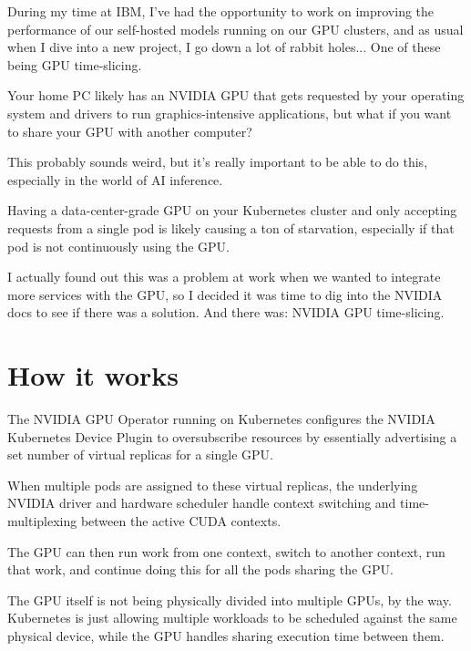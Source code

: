 

\newcommand{\DocTitle}{GPU sharing via Timeslicing in Kubernetes}
\newcommand{\DocDescription}{brother can you spare some GPU cycles?}
\newcommand{\DocTags}{writeup, GPUs, low-level}




During my time at IBM, I've had the opportunity to work on improving the performance of our self-hosted models running on our GPU clusters, and as usual when I dive into a new project, I go down a lot of rabbit holes... One of these being GPU time-slicing.

Your home PC likely has an NVIDIA GPU that gets requested by your operating system and drivers to run graphics-intensive applications, but what if you want to share your GPU with another computer?

This probably sounds weird, but it's really important to be able to do this, especially in the world of AI inference.

Having a data-center-grade GPU on your Kubernetes cluster and only accepting requests from a single pod is likely causing a ton of starvation, especially if that pod is not continuously using the GPU.

I actually found out this was a problem at work when we wanted to integrate more services with the GPU, so I decided it was time to dig into the NVIDIA docs to see if there was a solution. And there was: NVIDIA GPU time-slicing.

\section{How it works}

The NVIDIA GPU Operator running on Kubernetes configures the NVIDIA Kubernetes Device Plugin to oversubscribe resources by essentially advertising a set number of virtual replicas for a single GPU.

When multiple pods are assigned to these virtual replicas, the underlying NVIDIA driver and hardware scheduler handle context switching and time-multiplexing between the active CUDA contexts.

The GPU can then run work from one context, switch to another context, run that work, and continue doing this for all the pods sharing the GPU.

The GPU itself is not being physically divided into multiple GPUs, by the way. Kubernetes is just allowing multiple workloads to be scheduled against the same physical device, while the GPU handles sharing execution time between them.

